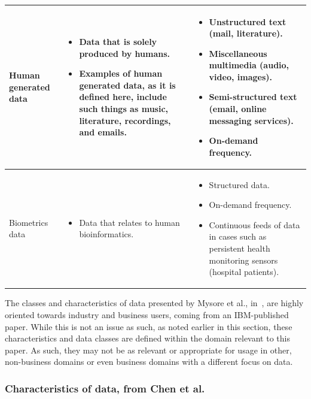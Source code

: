 \documentclass[a4paper,11pt]{article}
\begin{document}
\begin{tabular}{ | p{1.5cm} | p{8cm} | p{8cm} | }
Human generated data
&
\begin{itemize}
  \item Data that is solely produced by humans.
  \item Examples of human generated data, as it is defined here, include such things as music, literature, recordings,
  and emails.
\end{itemize}
&
\begin{itemize}
  \item Unstructured text (mail, literature).
  \item Miscellaneous multimedia (audio, video, images).
  \item Semi-structured text (email, online messaging services).
  \item On-demand frequency.
\end{itemize}
\\ \hline

 Biometrics data
 &
 \begin{itemize}
   \item Data that relates to human bioinformatics.
 \end{itemize}
 &
 \begin{itemize}
   \item Structured data.
   \item On-demand frequency.
   \item Continuous feeds of data in cases such as persistent health monitoring sensors (\ie{}hospital patients).
 \end{itemize}
 \\ \hline

\end{tabular}
\endgroup
\hspace*{5cm}

The classes and characteristics of data presented by Mysore et al., in~\cite{ibm_big_2013}, are highly oriented towards
industry and business users, coming from an IBM-published paper. While this is not an issue as such, as noted earlier
in this section, these characteristics and data classes are defined within the domain relevant to this paper. As such,
they may not be as relevant or appropriate for usage in other, non-business domains or even business domains with a
different focus on data.



\subsubsection{Characteristics of data, from Chen et al.} %
\label{ssub:characteristics_of_data_from_chen_et_al_}
\end{document}
